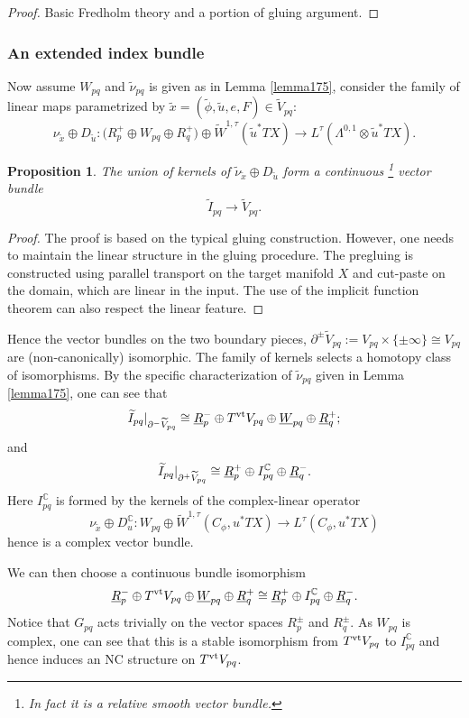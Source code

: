\documentclass[reqno, 10pt]{amsart}
\numberwithin{equation}{section}
\numberwithin{equation}{section}
\newtheorem{prop}[thm]{Proposition}
\theoremstyle{definition}
\theoremstyle{remark}
\newcommand{\beqn}{\begin{equation*}}
\newcommand{\eeqn}{\end{equation*}}
\newcommand{\mb}{\mathbb}
\newcommand{\wt}{\widetilde}
\newcommand{\uds}[1]{\underline{\smash{#1}}}
\begin{document}
\begin{proof}
Basic Fredholm theory and a portion of gluing argument.
\end{proof}

\subsubsection{An extended index bundle}

Now assume $W_{pq}$ and $\wt\nu_{pq}$ is given as in Lemma \ref{lemma175}, consider the family of linear maps parametrized by $\wt x = (\wt \phi, \wt u, e, F) \in \wt V_{pq}$:
\beqn
\nu_{\wt x} \oplus D_{\wt u}: \big( R_p^+ \oplus W_{pq} \oplus R_q^+ \big) \oplus \wt W^{1,\tau}(\wt u^* TX) \to L^ \tau (\Lambda^{0,1}\otimes \wt u^* TX).
\eeqn

\begin{prop}\label{prop1711}
The union of kernels of $\wt \nu_{\wt x} \oplus D_{\wt u}$ form a continuous \footnote{In fact it is a relative smooth vector bundle.} vector bundle 
\beqn
\wt I_{pq}  \to \wt V_{pq}.
\eeqn
\end{prop}

\begin{proof}
The proof is based on the typical gluing construction. However, one needs to maintain the linear structure in the gluing procedure. The pregluing is constructed using parallel transport on the target manifold $X$ and cut-paste on the domain, which are linear in the input. The use of the implicit function theorem can also respect the linear feature.
\end{proof}

Hence the vector bundles on the two boundary pieces, $\partial^\pm \wt V_{pq}:= V_{pq}\times \{\pm\infty\} \cong V_{pq}$ are (non-canonically) isomorphic. The family of kernels selects a homotopy class of isomorphisms. By the specific characterization of $\wt\nu_{pq}$ given in Lemma \ref{lemma175}, one can see that 
\beqn
\wt I_{pq} |_{\partial^- \wt V_{pq}} \cong \uds R_p^- \oplus T^{\rm vt} V_{pq} \oplus \uds W_{pq} \oplus \uds R_q^+;
\eeqn
and
\beqn
\wt I_{pq} |_{\partial^+ \wt V_{pq}} \cong \uds R_p^+ \oplus I_{pq}^{\mb C} \oplus \uds R_q^-.
\eeqn
Here $I_{pq}^{\mb C}$ is formed by the kernels of the complex-linear  operator 
\beqn
\nu_{\wt x} \oplus D_u^{\mb C}: W_{pq} \oplus \wt W^{1,\tau}(C_\phi, u^* TX) \to L^\tau( C_\phi, u^* TX)
\eeqn
hence is a complex vector bundle.

We can then choose a continuous bundle isomorphism
\beqn
\uds R_p^- \oplus T^{\rm vt} V_{pq} \oplus \uds W_{pq} \oplus \uds R_q^+ \cong \uds R_p^+ \oplus I_{pq}^{\mb C} \oplus \uds R_q^-.
\eeqn
Notice that $G_{pq}$ acts trivially on the vector spaces $R_p^\pm$ and $R_q^\pm$. As $W_{pq}$ is complex, one can see that this is a stable isomorphism from $T^{\rm vt} V_{pq}$ to $I_{pq}^{\mb C}$ and hence induces an NC structure on $T^{\rm vt} V_{pq}$. 
\end{document}
